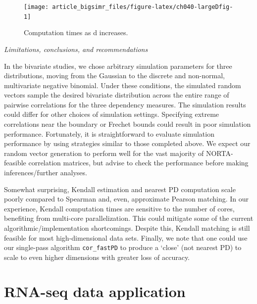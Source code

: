 \documentclass[
]{jss}
\begin{document}
\begin{CodeChunk}
\begin{figure}

{\centering \texttt{[image: article\_bigsimr\_files/figure-latex/ch040-largeDfig-1]} 

}

\caption[Computation times as d increases]{Computation times as d increases.}\label{fig:ch040-largeDfig}
\end{figure}
\end{CodeChunk}

\emph{Limitations, conclusions, and recommendations}

In the bivariate studies, we chose arbitrary simulation parameters for
three distributions, moving from the Gaussian to the discrete and
non-normal, multivariate negative binomial. Under these conditions, the
simulated random vectors sample the desired bivariate distribution
across the entire range of pairwise correlations for the three
dependency measures. The simulation results could differ for other
choices of simulation settings. Specifying extreme correlations near the
boundary or Frechet bounds could result in poor simulation performance.
Fortunately, it is straightforward to evaluate simulation performance by
using strategies similar to those completed above. We expect our random
vector generation to perform well for the vast majority of
NORTA-feasible correlation matrices, but advise to check the performance
before making inferences/further analyses.

Somewhat surprising, Kendall estimation and nearest PD computation scale
poorly compared to Spearman and, even, approximate Pearson matching. In
our experience, Kendall computation times are sensitive to the number of
cores, benefiting from multi-core parallelization. This could mitigate
some of the current algorithmic/implementation shortcomings. Despite
this, Kendall matching is still feasible for most high-dimensional data
sets. Finally, we note that one could use our single-pass algorithm
\texttt{cor\_fastPD} to produce a `close' (not nearest PD) to scale to
even higher dimensions with greater loss of accuracy.

\hypertarget{examples}{%
\section{RNA-seq data application}\label{examples}}
\end{document}
